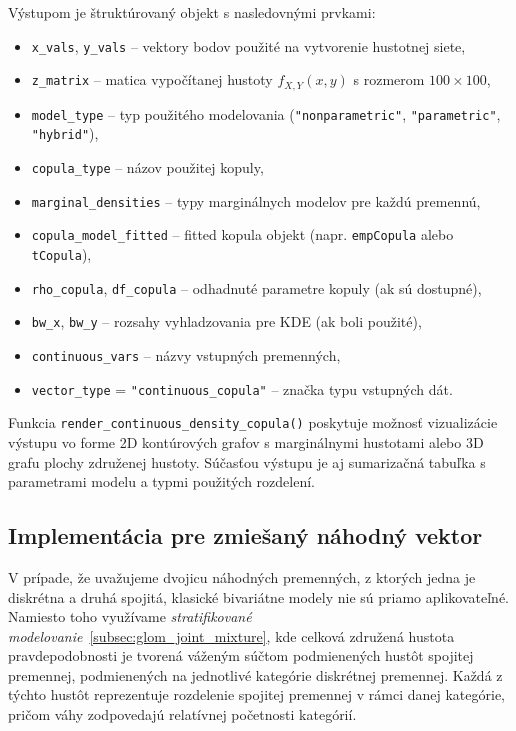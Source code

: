 Výstupom je štruktúrovaný objekt s nasledovnými prvkami:

\begin{itemize}
\setlength{\itemsep}{0pt}
  \setlength{\parskip}{0pt}
  \item \texttt{x\_vals}, \texttt{y\_vals} – vektory bodov použité na vytvorenie hustotnej siete,
  \item \texttt{z\_matrix} – matica vypočítanej hustoty $f_{X,Y}(x,y)$ s rozmerom $100 \times 100$,
  \item \texttt{model\_type} – typ použitého modelovania (\texttt{"nonparametric"}, \texttt{"parametric"}, \texttt{"hybrid"}),
  \item \texttt{copula\_type} – názov použitej kopuly,
  \item \texttt{marginal\_densities} – typy marginálnych modelov pre každú premennú,
  \item \texttt{copula\_model\_fitted} – fitted kopula objekt (napr. \texttt{empCopula} alebo \texttt{tCopula}),
  \item \texttt{rho\_copula}, \texttt{df\_copula} – odhadnuté parametre kopuly (ak sú dostupné),
  \item \texttt{bw\_x}, \texttt{bw\_y} – rozsahy vyhladzovania pre KDE (ak boli použité),
  \item \texttt{continuous\_vars} – názvy vstupných premenných,
  \item \texttt{vector\_type} = \texttt{"continuous\_copula"} – značka typu vstupných dát.
\end{itemize}

Funkcia \texttt{render\_continuous\_density\_copula()} poskytuje možnosť vizualizácie výstupu vo forme 2D kontúrových grafov s marginálnymi hustotami alebo 3D grafu plochy združenej hustoty. Súčasťou výstupu je aj sumarizačná tabuľka s parametrami modelu a typmi použitých rozdelení.

\subsection{Implementácia pre zmiešaný náhodný vektor}

V prípade, že uvažujeme dvojicu náhodných premenných, z ktorých jedna je diskrétna a druhá spojitá, klasické bivariátne modely nie sú priamo aplikovateľné. Namiesto toho využívame \emph{stratifikované modelovanie}~\ref{subsec:glom_joint_mixture}, kde celková združená hustota pravdepodobnosti je tvorená váženým súčtom podmienených hustôt spojitej premennej, podmienených na jednotlivé kategórie diskrétnej premennej. Každá z týchto hustôt reprezentuje rozdelenie spojitej premennej v rámci danej kategórie, pričom váhy zodpovedajú relatívnej početnosti kategórií.

